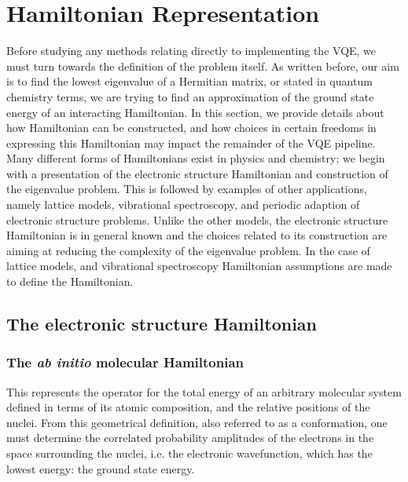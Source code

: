 \section{Hamiltonian Representation}\label{sec:Hamiltonian_representation}

Before studying any methods relating directly to implementing the VQE, we must turn towards the definition of the problem itself. As written before, our aim is to find the lowest eigenvalue of a Hermitian matrix, or stated in quantum chemistry terms, we are trying to find an approximation of the ground state energy of an interacting Hamiltonian. 
In this section, we provide details about how Hamiltonian can be constructed, and how choices in certain freedoms in expressing this Hamiltonian may impact the remainder of the VQE pipeline. Many different forms of Hamiltonians exist in physics and chemistry; we begin with a presentation of the electronic structure Hamiltonian and construction of the eigenvalue problem. This is followed by examples of other applications, namely lattice models, vibrational spectroscopy, and periodic adaption of electronic structure problems. Unlike the other models, the electronic structure Hamiltonian is in general known and the choices related to its construction are aiming at reducing the complexity of the eigenvalue problem. In the case of lattice models, and vibrational spectroscopy Hamiltonian assumptions are made to define the Hamiltonian. 

\subsection{The electronic structure Hamiltonian}

\subsubsection{The \textit{ab initio} molecular Hamiltonian}

This represents the operator for the total energy of an arbitrary molecular system defined in terms of its atomic composition, and the relative positions of the nuclei. From this geometrical definition, also referred to as a conformation, one must determine the correlated probability amplitudes of the electrons in the space surrounding the nuclei, i.e. the electronic wavefunction, which has the lowest energy: the ground state energy. %
 
